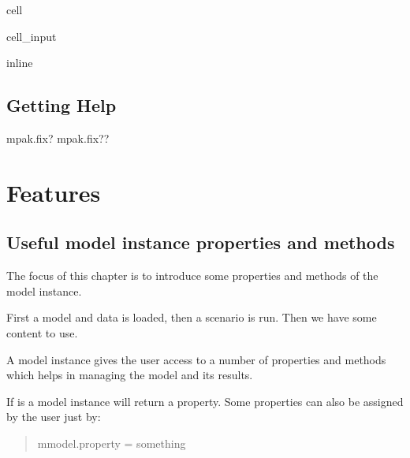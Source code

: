 \documentclass[letterpaper,10pt,english]{jupyterBook}
\begin{document}
\sphinxstepscope

\begin{sphinxuseclass}{cell}\begin{sphinxVerbatimInput}

\begin{sphinxuseclass}{cell_input}
\begin{sphinxVerbatim}[commandchars=\\\{\}]
 inline
\end{sphinxVerbatim}

\end{sphinxuseclass}\end{sphinxVerbatimInput}

\end{sphinxuseclass}

\chapter{Getting Help}
\label{\detokenize{content/07_MoreFeatures/GettingHelp:getting-help}}\label{\detokenize{content/07_MoreFeatures/GettingHelp::doc}}
\sphinxAtStartPar
mpak.fix?
mpak.fix??

\sphinxstepscope


\part{Features}

\sphinxstepscope


\chapter{Useful model instance properties and methods}
\label{\detokenize{content/notebooks/modelflow_features:useful-model-instance-properties-and-methods}}\label{\detokenize{content/notebooks/modelflow_features::doc}}
\sphinxAtStartPar
The focus of this chapter is to introduce some properties and methods of the model instance.

\sphinxAtStartPar
First a model and data is loaded, then a scenario is run. Then we have some content to use.

\sphinxAtStartPar
A model instance gives the user access to a number of properties and methods which helps in managing the model and its results.

\sphinxAtStartPar
If  is a model instance  will return a property. Some properties can also be assigned by the user just by:
\begin{quote}

\sphinxAtStartPar
mmodel.property = something
\end{quote}
\end{document}
